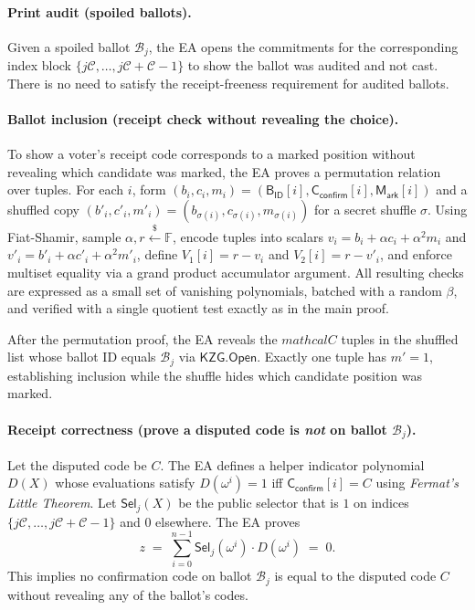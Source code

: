 \documentclass{llncs}
\begin{document}
\paragraph{Print audit (spoiled ballots).}
Given a spoiled ballot $\mathcal{B}_j$, the EA opens the commitments for the corresponding index block $\{j\mathcal{C},\dots,j\mathcal{C}+\mathcal{C}-1\}$ to show the ballot was audited and not cast.
There is no need to satisfy the receipt-freeness requirement for audited ballots.

\paragraph{Ballot inclusion (receipt check without revealing the choice).}
To show a voter’s receipt code corresponds to a marked position without revealing which candidate was marked, the EA proves a permutation relation over tuples.
For each $i$, form $(b_i,c_i,m_i)=(\mathsf{B_{ID}}[i],\mathsf{C}_{\mathsf{confirm}}[i],\mathsf{M_{ark}}[i])$ and a shuffled copy
$(b'_i,c'_i,m'_i)=(b_{\sigma(i)},c_{\sigma(i)},m_{\sigma(i)})$ for a secret shuffle $\sigma$.
Using Fiat-Shamir, sample $\alpha,r\stackrel{\$}{\leftarrow} \mathbb{F}$, encode tuples into scalars
$v_i=b_i+\alpha c_i+\alpha^2 m_i$ and $v'_i=b'_i+\alpha c'_i+\alpha^2 m'_i$, define
$V_1[i]=r-v_i$ and $V_2[i]=r-v'_i$, and enforce multiset equality via a grand product accumulator argument.
All resulting checks are expressed as a small set of vanishing polynomials, batched with
a random $\beta$, and verified with a single quotient test exactly as in the main proof.  

After the permutation proof, the EA reveals the $mathcal{C}$ tuples in the shuffled list whose ballot ID equals $\mathcal{B}_j$ via $\mathsf{KZG.Open}$.
Exactly one tuple has $m'=1$, establishing inclusion while the shuffle hides which candidate position was marked.

\paragraph{Receipt correctness (prove a disputed code is \emph{not} on ballot $\mathcal{B}_j$).}
Let the disputed code be $C$. The EA defines a helper indicator polynomial $D(X)$ whose evaluations satisfy
$D(\omega^i)=1$ iff $\mathsf{C}_{\mathsf{confirm}}[i]=C$ using \emph{Fermat's Little Theorem}.
Let $\mathsf{Sel}_j(X)$ be the public selector that is $1$ on indices $\{j\mathcal{C},\dots,j\mathcal{C}+\mathcal{C}-1\}$ and $0$ elsewhere.
The EA proves
\[
z \;=\; \sum_{i=0}^{n-1}\mathsf{Sel}_j(\omega^i)\cdot D(\omega^i) \;=\; 0.
\]
This implies no confirmation code on ballot $\mathcal{B}_j$ is equal to the disputed code $C$ without revealing any of the ballot’s codes.
\end{document}

